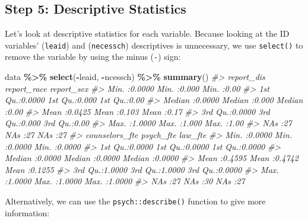 \documentclass[
]{book}
\newenvironment{Shaded}{\begin{snugshade}}{\end{snugshade}}
\newcommand{\CommentTok}[1]{\textcolor[rgb]{0.56,0.35,0.01}{\textit{#1}}}
\newcommand{\FunctionTok}[1]{\textcolor[rgb]{0.13,0.29,0.53}{\textbf{#1}}}
\newcommand{\NormalTok}[1]{#1}
\newcommand{\SpecialCharTok}[1]{\textcolor[rgb]{0.81,0.36,0.00}{\textbf{#1}}}
\begin{document}
\subsection{Step 5: Descriptive Statistics}\label{step-5-descriptive-statistics}

Let's look at descriptive statistics for each variable.
Because looking at the ID variables' (\texttt{leaid}) and (\texttt{necessch}) descriptives is unnecessary, we use \texttt{select()} to remove the variable by using the minus (\texttt{-}) sign:

\begin{Shaded}
\begin{Highlighting}[]
\NormalTok{data }\SpecialCharTok{\%\textgreater{}\%} 
  \FunctionTok{select}\NormalTok{(}\SpecialCharTok{{-}}\NormalTok{leaid, }\SpecialCharTok{{-}}\NormalTok{ncessch) }\SpecialCharTok{\%\textgreater{}\%} 
  \FunctionTok{summary}\NormalTok{()}
\CommentTok{\#\textgreater{}    report\_dis      report\_race      report\_sex  }
\CommentTok{\#\textgreater{}  Min.   :0.0000   Min.   :0.000   Min.   :0.00  }
\CommentTok{\#\textgreater{}  1st Qu.:0.0000   1st Qu.:0.000   1st Qu.:0.00  }
\CommentTok{\#\textgreater{}  Median :0.0000   Median :0.000   Median :0.00  }
\CommentTok{\#\textgreater{}  Mean   :0.0425   Mean   :0.103   Mean   :0.17  }
\CommentTok{\#\textgreater{}  3rd Qu.:0.0000   3rd Qu.:0.000   3rd Qu.:0.00  }
\CommentTok{\#\textgreater{}  Max.   :1.0000   Max.   :1.000   Max.   :1.00  }
\CommentTok{\#\textgreater{}  NA\textquotesingle{}s   :27       NA\textquotesingle{}s   :27      NA\textquotesingle{}s   :27    }
\CommentTok{\#\textgreater{}  counselors\_fte     psych\_fte         law\_fte      }
\CommentTok{\#\textgreater{}  Min.   :0.0000   Min.   :0.0000   Min.   :0.0000  }
\CommentTok{\#\textgreater{}  1st Qu.:0.0000   1st Qu.:0.0000   1st Qu.:0.0000  }
\CommentTok{\#\textgreater{}  Median :0.0000   Median :0.0000   Median :0.0000  }
\CommentTok{\#\textgreater{}  Mean   :0.4595   Mean   :0.4742   Mean   :0.1255  }
\CommentTok{\#\textgreater{}  3rd Qu.:1.0000   3rd Qu.:1.0000   3rd Qu.:0.0000  }
\CommentTok{\#\textgreater{}  Max.   :1.0000   Max.   :1.0000   Max.   :1.0000  }
\CommentTok{\#\textgreater{}  NA\textquotesingle{}s   :27       NA\textquotesingle{}s   :30       NA\textquotesingle{}s   :27}
\end{Highlighting}
\end{Shaded}

Alternatively, we can use the \texttt{psych::describe()} function to give more information:
\end{document}
